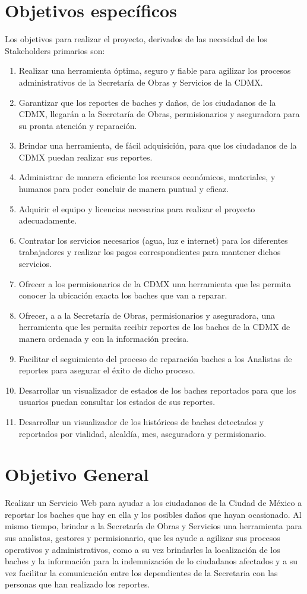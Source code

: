 \chapter{Objetivos específicos}
Los objetivos para realizar el proyecto, derivados de las necesidad de los Stakeholders primarios son:

\begin{enumerate}
     \item Realizar una herramienta óptima, seguro y fiable para agilizar los procesos administrativos de la Secretaría de Obras y Servicios de la CDMX.
    \item Garantizar que los reportes de baches y daños, de los ciudadanos de la CDMX, llegarán a la Secretaría de Obras, permisionarios y aseguradora para su pronta atención y reparación.
    \item Brindar una herramienta, de fácil adquisición, para que los ciudadanos de la CDMX puedan realizar sus reportes.
    \item Administrar de manera eficiente los recursos económicos, materiales, y humanos para poder concluir de manera puntual y eficaz.
    \item Adquirir el equipo y licencias necesarias para realizar el proyecto adecuadamente.
    \item Contratar los servicios necesarios (agua, luz e internet) para los diferentes trabajadores y realizar los pagos correspondientes para mantener dichos servicios.
    \item Ofrecer a los permisionarios de la CDMX una herramienta que les permita conocer la ubicación exacta los baches que van a reparar.
    \item Ofrecer, a  a la Secretaría de Obras, permisionarios y aseguradora, una herramienta que les permita recibir reportes de los baches de la CDMX de manera ordenada y con la información precisa.
    \item Facilitar el seguimiento del proceso de reparación baches a los Analistas de reportes para asegurar el éxito de dicho proceso.
    \item Desarrollar un visualizador de estados de los baches reportados para que los usuarios puedan consultar los estados de sus reportes.
    \item Desarrollar un visualizador de los históricos de baches detectados y reportados por vialidad, alcaldía, mes, aseguradora y permisionario.
\end{enumerate}

\chapter{Objetivo General}
Realizar un Servicio Web para ayudar a los ciudadanos de la Ciudad de México a reportar los baches que hay en ella y los posibles daños que hayan ocasionado. Al mismo tiempo, brindar a  la Secretaría de Obras y Servicios una herramienta para sus analistas, gestores y permisionario, que les ayude a agilizar sus procesos operativos y administrativos, como a su vez brindarles la localización de los baches y la información para la indemnización de lo ciudadanos afectados y a su vez facilitar la comunicación entre los dependientes de la Secretaria con las personas que han realizado los reportes.

